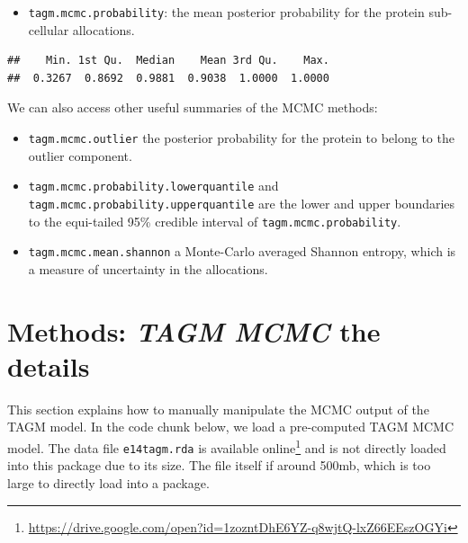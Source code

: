 \documentclass[
]{article}
\newenvironment{Shaded}{\begin{snugshade}}{\end{snugshade}}
\newcommand{\KeywordTok}[1]{\textcolor[rgb]{0.13,0.29,0.53}{\textbf{#1}}}
\newcommand{\NormalTok}[1]{#1}
\newcommand{\OperatorTok}[1]{\textcolor[rgb]{0.81,0.36,0.00}{\textbf{#1}}}
\providecommand{\tightlist}{%
  \setlength{\itemsep}{0pt}\setlength{\parskip}{0pt}}
\begin{document}
\begin{itemize}
\tightlist
\item
  \texttt{tagm.mcmc.probability}: the mean posterior probability for the
  protein sub-cellular allocations.
\end{itemize}

\begin{Shaded}
\end{Shaded}

\begin{verbatim}
##    Min. 1st Qu.  Median    Mean 3rd Qu.    Max. 
##  0.3267  0.8692  0.9881  0.9038  1.0000  1.0000
\end{verbatim}

We can also access other useful summaries of the MCMC methods:

\begin{itemize}
\item
  \texttt{tagm.mcmc.outlier} the posterior probability for the protein
  to belong to the outlier component.
\item
  \texttt{tagm.mcmc.probability.lowerquantile} and
  \texttt{tagm.mcmc.probability.upperquantile} are the lower and upper
  boundaries to the equi-tailed 95\% credible interval of
  \texttt{tagm.mcmc.probability}.
\item
  \texttt{tagm.mcmc.mean.shannon} a Monte-Carlo averaged Shannon
  entropy, which is a measure of uncertainty in the allocations.
\end{itemize}

\hypertarget{methods-tagm-mcmc-the-details}{%
\section{\texorpdfstring{Methods: \emph{TAGM MCMC} the
details}{Methods: TAGM MCMC the details}}\label{methods-tagm-mcmc-the-details}}

This section explains how to manually manipulate the MCMC output of the
TAGM model. In the code chunk below, we load a pre-computed TAGM MCMC
model. The data file \texttt{e14tagm.rda} is available online\footnote{\url{https://drive.google.com/open?id=1zozntDhE6YZ-q8wjtQ-lxZ66EEszOGYi}}
and is not directly loaded into this package due to its size. The file
itself if around 500mb, which is too large to directly load into a
package.
\end{document}
